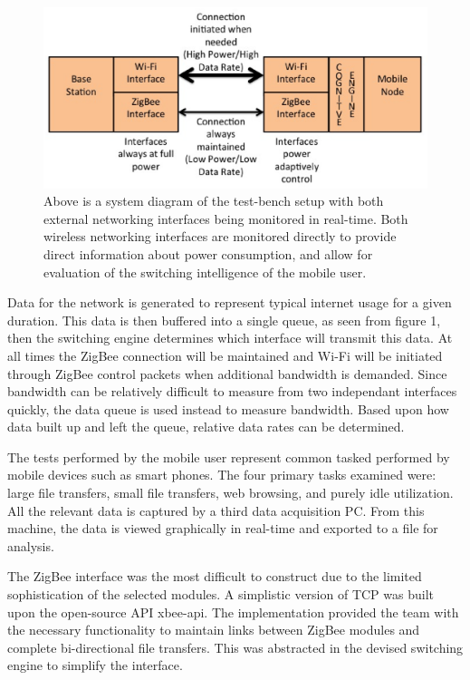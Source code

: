 \documentclass[conference]{IEEEtran}
\begin{document}
\begin{figure}
\begin{center}
\includegraphics[scale=0.35]{system_diagram.eps}
\caption{Above is a system diagram of the test-bench setup with both external networking interfaces being monitored in real-time.  Both wireless networking interfaces are monitored directly to provide direct information about power consumption, and allow for evaluation of the switching intelligence of the mobile user.}
\end{center}
\end{figure}

Data for the network is generated to represent typical internet usage for a given duration.  This data is then buffered into a single queue, as seen from figure 1, then the switching engine determines which interface will transmit this data.  At all times the ZigBee connection will be maintained and Wi-Fi will be initiated through ZigBee control packets when additional bandwidth is demanded.  Since bandwidth can be relatively difficult to measure from two independant interfaces quickly, the data queue is used instead to measure bandwidth.  Based upon how data built up and left the queue, relative data rates can be determined.

The tests performed by the mobile user represent common tasked performed by mobile devices such as smart phones.  The four primary tasks examined were: large file transfers, small file transfers, web browsing, and purely idle utilization.  All the relevant data is captured by a third data acquisition PC. From this machine, the data is viewed graphically in real-time and exported to a file for analysis. 

The ZigBee interface was the most difficult to construct due to the limited sophistication of the selected modules.  A simplistic version of TCP was built upon the open-source API xbee-api\cite{fifteen}.  The implementation provided the team with the necessary functionality to maintain links between ZigBee modules and complete bi-directional file transfers.  This was abstracted in the devised switching engine to simplify the interface.
\end{document}
